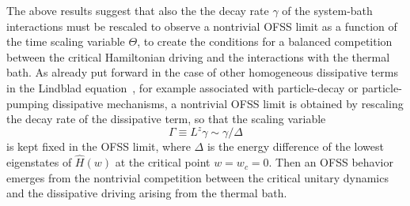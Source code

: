 The above results suggest that also the the decay rate $\gamma$ of the
system-bath interactions must be rescaled to observe a nontrivial OFSS
limit as a function of the time scaling variable $\Theta$, to create
the conditions for a balanced competition between the critical
Hamiltonian driving and the interactions with the thermal bath. As
already put forward in the case of other homogeneous dissipative terms
in the Lindblad equation~\cite{NRV-2019-competingdissipativeandcoherent,rossini2020dynamic,TV-2021-dissipativeboundaries,rossini2021coherent,franchi2023Liouvillian},
for example associated with particle-decay or particle-pumping
dissipative mechanisms, a nontrivial OFSS limit is obtained by
rescaling the decay rate of the dissipative term, so that the scaling
variable
\begin{equation}
  \Gamma \equiv L^z \gamma \sim \gamma/\Delta
  \label{gammadef}
\end{equation}
is kept fixed in the OFSS limit, where $\Delta$ is the energy
difference of the lowest eigenstates of $\hat{H}(w)$ at the critical
point $w=w_c=0$.  Then an OFSS behavior emerges from the nontrivial
competition between the critical unitary dynamics and the dissipative
driving arising from the thermal bath.


